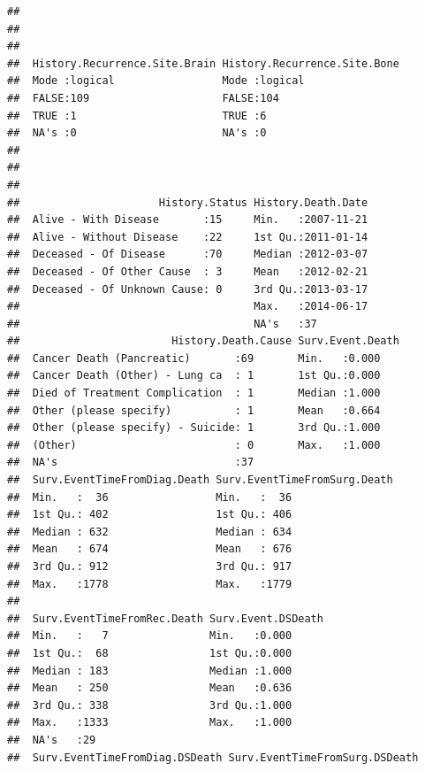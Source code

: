 \documentclass{article}
\begin{document}
\begin{knitrout}
\begin{kframe}
\begin{verbatim}
##                                                            
##                                                            
##                                                            
##  History.Recurrence.Site.Brain History.Recurrence.Site.Bone
##  Mode :logical                 Mode :logical               
##  FALSE:109                     FALSE:104                   
##  TRUE :1                       TRUE :6                     
##  NA's :0                       NA's :0                     
##                                                            
##                                                            
##                                                            
##                      History.Status History.Death.Date  
##  Alive - With Disease       :15     Min.   :2007-11-21  
##  Alive - Without Disease    :22     1st Qu.:2011-01-14  
##  Deceased - Of Disease      :70     Median :2012-03-07  
##  Deceased - Of Other Cause  : 3     Mean   :2012-02-21  
##  Deceased - Of Unknown Cause: 0     3rd Qu.:2013-03-17  
##                                     Max.   :2014-06-17  
##                                     NA's   :37          
##                        History.Death.Cause Surv.Event.Death
##  Cancer Death (Pancreatic)       :69       Min.   :0.000   
##  Cancer Death (Other) - Lung ca  : 1       1st Qu.:0.000   
##  Died of Treatment Complication  : 1       Median :1.000   
##  Other (please specify)          : 1       Mean   :0.664   
##  Other (please specify) - Suicide: 1       3rd Qu.:1.000   
##  (Other)                         : 0       Max.   :1.000   
##  NA's                            :37                       
##  Surv.EventTimeFromDiag.Death Surv.EventTimeFromSurg.Death
##  Min.   :  36                 Min.   :  36                
##  1st Qu.: 402                 1st Qu.: 406                
##  Median : 632                 Median : 634                
##  Mean   : 674                 Mean   : 676                
##  3rd Qu.: 912                 3rd Qu.: 917                
##  Max.   :1778                 Max.   :1779                
##                                                           
##  Surv.EventTimeFromRec.Death Surv.Event.DSDeath
##  Min.   :   7                Min.   :0.000     
##  1st Qu.:  68                1st Qu.:0.000     
##  Median : 183                Median :1.000     
##  Mean   : 250                Mean   :0.636     
##  3rd Qu.: 338                3rd Qu.:1.000     
##  Max.   :1333                Max.   :1.000     
##  NA's   :29                                    
##  Surv.EventTimeFromDiag.DSDeath Surv.EventTimeFromSurg.DSDeath

\end{verbatim}
\end{kframe}
\end{knitrout}
\end{document}
